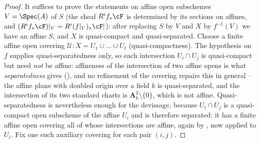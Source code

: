 \begin{proof}
It suffices to prove the statements on affine open subschemes
$V=\Spec(A)$ of $S$ (the sheaf $R^if_*\cF$ is determined by its
sections on affines, and $(R^if_*\cF)|_V=R^i(f|_V)_*\cF|$): after
replacing $S$ by $V$ and $X$ by $f^{-1}(V)$ we have an affine $S$,
and $X$ is quasi-compact and quasi-separated.  Choose a finite affine
open covering $\mathcal U:X=U_1\cup\dots\cup U_t$ (quasi-compactness).
The hypothesis on $f$ supplies quasi-separatedness only, so each
intersection $U_i\cap U_j$ is quasi-compact but need \emph{not} be
affine: affineness of the intersection of two affine opens is what
\emph{separatedness} gives
(), and no refinement of the
covering repairs this in general -- the affine plane with doubled
origin over a field $k$ is quasi-separated, and the intersection of
its two standard charts is $\mathbf A^2_k\setminus\{0\}$, which is not
affine.  Quasi-separatedness is nevertheless enough for the devissage,
because $U_i\cap U_j$ is a quasi-compact open subscheme of the affine
$U_i$ and is therefore separated: it has a finite affine open covering
all of whose intersections are affine, again by
, now applied to $U_i$.  Fix
one such auxiliary covering for each pair $(i,j)$.


\end{proof}
